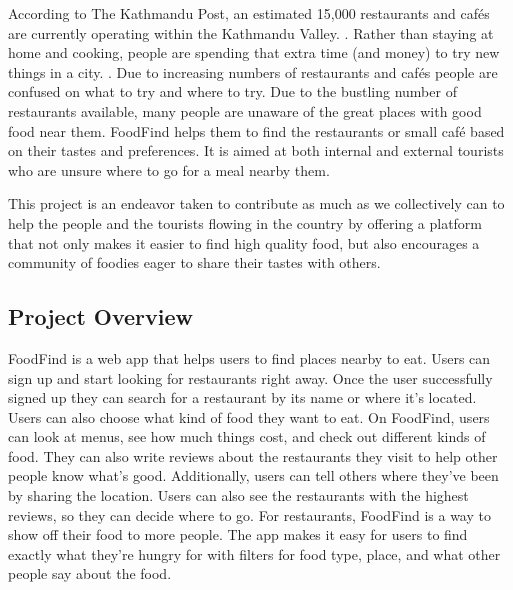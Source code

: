 \documentclass[12pt, a4paper, oneside]{article}
\begin{document}
According to The Kathmandu Post, an estimated 15,000 restaurants and cafés are currently operating within the Kathmandu Valley. \cite{kathmandupost}. Rather than staying at home and cooking, people are spending that extra time (and money) to try new things in a city. \cite{newbusiness}. Due to increasing numbers of restaurants and cafés people are confused on what to try and where to try. Due to the bustling number of restaurants available, many people are unaware of the great places with good food near them. FoodFind helps them to find the restaurants or small café based on their tastes and preferences. It is aimed at both internal and external tourists who are unsure where to go for a meal nearby them. 

This project is an endeavor taken to contribute as much as we collectively can to help the people and the tourists flowing in the country by offering a platform that not only makes it easier to find high quality food, but also encourages a community of foodies eager to share their tastes with others.


\subsection{Project Overview}
FoodFind is a web app that helps users to find places nearby to eat. Users can sign up and start looking for restaurants right away. Once the user successfully signed up they can search for a restaurant by its name or where it’s located. Users can also choose what kind of food they want to eat. On FoodFind, users can look at menus, see how much things cost, and check out different kinds of food. They can also write reviews about the restaurants they visit to help other people know what’s good. Additionally, users can tell others where they’ve been by sharing the location. Users can also see the restaurants with the highest reviews, so they can decide where to go. For restaurants, FoodFind is a way to show off their food to more people. The app makes it easy for users to find exactly what they’re hungry for with filters for food type, place, and what other people say about the food.
\end{document}
